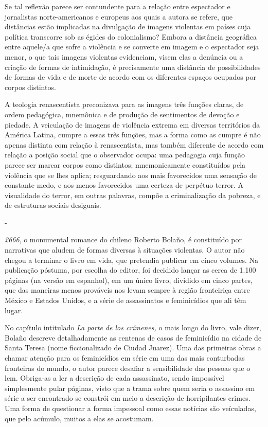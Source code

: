 Se tal reflexão parece ser contundente para a relação entre espectador e
jornalistas norte-americanos e europeus aos quais a autora se refere,
que distâncias estão implicadas na divulgação de imagens violentas em
países cuja política transcorre sob as égides do colonialismo? Embora a
distância geográfica entre aquele/a que sofre a violência e se converte
em imagem e o espectador seja menor, o que tais imagens violentas
evidenciam, visem elas a denúncia ou a criação de formas de intimidação,
é precisamente uma distância de possibilidades de formas de vida e de
morte de acordo com os diferentes espaços ocupados por corpos distintos.

A teologia renascentista preconizava para as imagens três funções
claras, de ordem pedagógica, mnemônica e de produção de sentimentos de
devoção e piedade. A veiculação de imagens de violência extrema em
diversas territórios da América Latina, cumpre a essas três funções, mas
a forma como as cumpre é não apenas distinta com relação à
renascentista, mas também diferente de acordo com relação a posição
social que o observador ocupa: uma pedagogia cuja função parece ser
marcar corpos como distintos; mnemonicamente constituídos pela violência
que se lhes aplica; resguardando aos mais favorecidos uma sensação de
constante medo, e aos menos favorecidos uma certeza de perpétuo terror.
A visualidade do terror, em outras palavras, compõe a criminalização da
pobreza, e de estruturas sociais desiguais.

-

\emph{2666}, o monumental romance do chileno Roberto Bolaño, é
constituído por narrativas que aludem de formas diversas à situações
violentas. O autor não chegou a terminar o livro em vida, que pretendia
publicar em cinco volumes. Na publicação póstuma, por escolha do editor,
foi decidido lançar as cerca de 1.100 páginas (na versão em espanhol),
em um único livro, dividido em cinco partes, que das maneiras menos
prováveis nos levam sempre à região fronteiriça entre México e Estados
Unidos, e a série de assassinatos e feminicídios que ali têm lugar.

No capítulo intitulado \emph{La parte de los crímenes,} o mais longo do
livro, vale dizer, Bolaño descreve detalhadamente as centenas de casos
de feminicídio na cidade de Santa Teresa (nome ficcionalizado de Ciudad
Juarez). Uma das primeiras obras a chamar atenção para os feminicídios
em série em uma das mais conturbadas fronteiras do mundo, o autor parece
desafiar a sensibilidade das pessoas que o lem. Obriga-as a ler a
descrição de cada assassinato, sendo impossível simplesmente pular
páginas, visto que a trama sobre quem seria o assassino em série a ser
encontrado se constrói em meio a descrição de horripilantes crimes. Uma
forma de questionar a forma impessoal como essas notícias são
veículadas, que pelo acúmulo, muitos a elas se acostumam.

